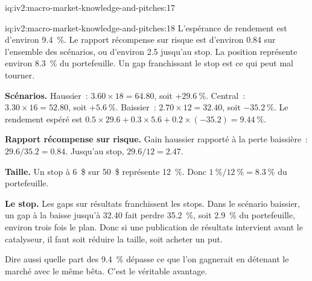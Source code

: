 \begin{solution}{iq:iv2:macro-market-knowledge-and-pitches:17}
\end{solution}

\begin{solution}{iq:iv2:macro-market-knowledge-and-pitches:18}
L'espérance de rendement est d'environ 9.4~\%. Le rapport récompense sur risque est d'environ 0.84 sur l'ensemble des scénarios, ou d'environ 2.5 jusqu'au stop. La position représente environ 8.3~\% du portefeuille. Un gap franchissant le stop est ce qui peut mal tourner.

\textbf{Scénarios.} Haussier~: $3.60 \times 18 = 64.80$, soit $+29.6~\%$. Central~: $3.30 \times 16 = 52.80$, soit $+5.6~\%$. Baissier~: $2.70 \times 12 = 32.40$, soit $-35.2~\%$. Le rendement espéré est $0.5 \times 29.6 + 0.3 \times 5.6 + 0.2 \times (-35.2) = 9.44~\%$.

\textbf{Rapport récompense sur risque.} Gain haussier rapporté à la perte baissière~: $29.6/35.2 = 0.84$. Jusqu'au stop, $29.6/12 = 2.47$.

\textbf{Taille.} Un stop à 6~\$ sur 50~\$ représente 12~\%. Donc $1~\%/12~\% = 8.3~\%$ du portefeuille.

\textbf{Le stop.} Les gaps sur résultats franchissent les stops. Dans le scénario baissier, un gap à la baisse jusqu'à 32.40 fait perdre 35.2~\%, soit 2.9~\% du portefeuille, environ trois fois le plan. Donc si une publication de résultats intervient avant le catalyseur, il faut soit réduire la taille, soit acheter un put.

Dire aussi quelle part des 9.4~\% dépasse ce que l'on gagnerait en détenant le marché avec le même bêta. C'est le véritable avantage.

\end{solution}

